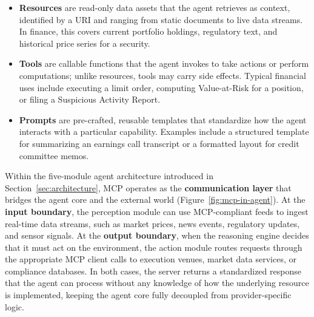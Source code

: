\documentclass{article}
\begin{document}
\begin{itemize}
  \item \textbf{Resources} are read-only data assets that the agent retrieves as context, identified by a URI and ranging from static documents to live data streams. In finance, this covers current portfolio holdings, regulatory text, and historical price series for a security.

  \item \textbf{Tools} are callable functions that the agent invokes to take actions or perform computations; unlike resources, tools may carry side effects. Typical financial uses include executing a limit order, computing Value-at-Risk for a position, or filing a Suspicious Activity Report.

  \item \textbf{Prompts} are pre-crafted, reusable templates that standardize how the agent interacts with a particular capability. Examples include a structured template for summarizing an earnings call transcript or a formatted layout for credit committee memos.
\end{itemize}

Within the five-module agent architecture introduced in Section~\ref{sec:architecture}, MCP operates as the \textbf{communication layer} that bridges the agent core and the external world (Figure~\ref{fig:mcp-in-agent}). At the \textbf{input boundary}, the perception module can use MCP-compliant feeds to ingest real-time data streams, such as market prices, news events, regulatory updates, and sensor signals. At the \textbf{output boundary}, when the reasoning engine decides that it must act on the environment, the action module routes requests through the appropriate MCP client calls to execution venues, market data services, or compliance databases. In both cases, the server returns a standardized response that the agent can process without any knowledge of how the underlying resource is implemented, keeping the agent core fully decoupled from provider-specific logic.
\end{document}
